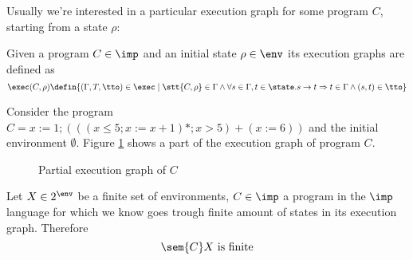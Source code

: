 Usually we're interested in a particular execution graph for some
program \(C\), starting from a state \(\rho\):

\begin{definition}
  Given a program \(C\in\imp\) and an initial state \(\rho\in\env\)
  its execution graphs are defined as \[\exec(C,\rho) \defin
  \{(\Gamma,T,\tto) \in \exec \mid \stt{C,\rho} \in \Gamma \wedge
  \forall s \in \Gamma, t\in\state . s \to t \Rightarrow t \in \Gamma
  \wedge (s,t) \in \tto\}\]
\end{definition}

\begin{example}
  Consider the program \(C = x := 1; (((x\leq 5; x := x + 1)*;x>5) +
  (x := 6))\) and the initial environment \(\emptyset\).  Figure
  \ref{fig:exec} shows a part of the execution graph of program \(C\).
  
  \begin{figure}
    \centering
    \usetikzlibrary{positioning}
    \usetikzlibrary{graphs}
    \caption{Partial execution graph of \(C\)}\label{fig:exec}
  \end{figure}
\end{example}

\begin{lemma}\label{le:finite}
  Let \(X \in 2^\env\) be a finite set of environments, \(C \in \imp\)
  a program in the \(\imp\) language for which we know goes trough
  finite amount of states in its execution graph. Therefore \[\sem{C}X
  \text{ is finite}\]
\end{lemma}

